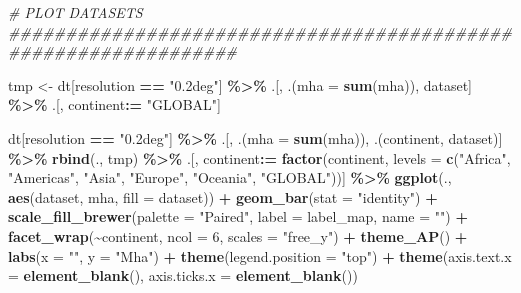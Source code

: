 \documentclass[
  11pt,
]{article}
\newenvironment{Shaded}{\begin{snugshade}}{\end{snugshade}}
\newcommand{\AttributeTok}[1]{\textcolor[rgb]{0.13,0.29,0.53}{#1}}
\newcommand{\CommentTok}[1]{\textcolor[rgb]{0.56,0.35,0.01}{\textit{#1}}}
\newcommand{\DecValTok}[1]{\textcolor[rgb]{0.00,0.00,0.81}{#1}}
\newcommand{\FunctionTok}[1]{\textcolor[rgb]{0.13,0.29,0.53}{\textbf{#1}}}
\newcommand{\NormalTok}[1]{#1}
\newcommand{\OtherTok}[1]{\textcolor[rgb]{0.56,0.35,0.01}{#1}}
\newcommand{\SpecialCharTok}[1]{\textcolor[rgb]{0.81,0.36,0.00}{\textbf{#1}}}
\newcommand{\StringTok}[1]{\textcolor[rgb]{0.31,0.60,0.02}{#1}}
\begin{document}
\begin{Shaded}
\begin{Highlighting}[]
\CommentTok{\# PLOT DATASETS \#\#\#\#\#\#\#\#\#\#\#\#\#\#\#\#\#\#\#\#\#\#\#\#\#\#\#\#\#\#\#\#\#\#\#\#\#\#\#\#\#\#\#\#\#\#\#\#\#\#\#\#\#\#\#\#\#\#\#\#\#\#\#\#}

\NormalTok{tmp }\OtherTok{\textless{}{-}}\NormalTok{ dt[resolution }\SpecialCharTok{==} \StringTok{"0.2deg"}\NormalTok{] }\SpecialCharTok{\%\textgreater{}\%}
\NormalTok{  .[, .(}\AttributeTok{mha =} \FunctionTok{sum}\NormalTok{(mha)), dataset] }\SpecialCharTok{\%\textgreater{}\%}
\NormalTok{  .[, continent}\SpecialCharTok{:=} \StringTok{"GLOBAL"}\NormalTok{]}

\NormalTok{dt[resolution }\SpecialCharTok{==} \StringTok{"0.2deg"}\NormalTok{] }\SpecialCharTok{\%\textgreater{}\%}
\NormalTok{  .[, .(}\AttributeTok{mha =} \FunctionTok{sum}\NormalTok{(mha)), .(continent, dataset)] }\SpecialCharTok{\%\textgreater{}\%}
  \FunctionTok{rbind}\NormalTok{(., tmp) }\SpecialCharTok{\%\textgreater{}\%}
\NormalTok{  .[, continent}\SpecialCharTok{:=} \FunctionTok{factor}\NormalTok{(continent, }\AttributeTok{levels =} \FunctionTok{c}\NormalTok{(}\StringTok{"Africa"}\NormalTok{, }\StringTok{"Americas"}\NormalTok{,}
                                               \StringTok{"Asia"}\NormalTok{, }\StringTok{"Europe"}\NormalTok{, }\StringTok{"Oceania"}\NormalTok{,}
                                               \StringTok{"GLOBAL"}\NormalTok{))] }\SpecialCharTok{\%\textgreater{}\%}
  \FunctionTok{ggplot}\NormalTok{(., }\FunctionTok{aes}\NormalTok{(dataset, mha, }\AttributeTok{fill =}\NormalTok{ dataset)) }\SpecialCharTok{+}
  \FunctionTok{geom\_bar}\NormalTok{(}\AttributeTok{stat =} \StringTok{"identity"}\NormalTok{) }\SpecialCharTok{+}
  \FunctionTok{scale\_fill\_brewer}\NormalTok{(}\AttributeTok{palette =} \StringTok{"Paired"}\NormalTok{, }\AttributeTok{label =}\NormalTok{ label\_map, }\AttributeTok{name =} \StringTok{""}\NormalTok{) }\SpecialCharTok{+}
  \FunctionTok{facet\_wrap}\NormalTok{(}\SpecialCharTok{\textasciitilde{}}\NormalTok{continent, }\AttributeTok{ncol =} \DecValTok{6}\NormalTok{, }\AttributeTok{scales =} \StringTok{"free\_y"}\NormalTok{) }\SpecialCharTok{+}
  \FunctionTok{theme\_AP}\NormalTok{() }\SpecialCharTok{+}
  \FunctionTok{labs}\NormalTok{(}\AttributeTok{x =} \StringTok{""}\NormalTok{, }\AttributeTok{y =} \StringTok{"Mha"}\NormalTok{) }\SpecialCharTok{+}
  \FunctionTok{theme}\NormalTok{(}\AttributeTok{legend.position =} \StringTok{"top"}\NormalTok{) }\SpecialCharTok{+}
  \FunctionTok{theme}\NormalTok{(}\AttributeTok{axis.text.x =} \FunctionTok{element\_blank}\NormalTok{(),}
        \AttributeTok{axis.ticks.x =} \FunctionTok{element\_blank}\NormalTok{())}
\end{Highlighting}
\end{Shaded}
\end{document}
